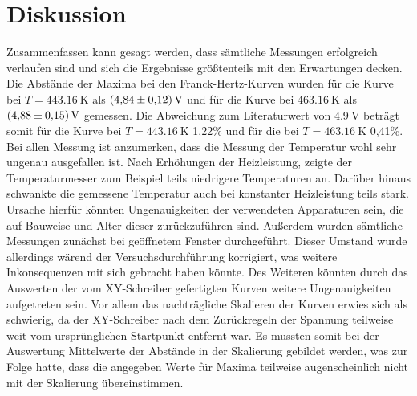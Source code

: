 \section{Diskussion}
\label{sec:Diskussion}

Zusammenfassen kann gesagt werden, dass sämtliche Messungen erfolgreich verlaufen sind und sich die Ergebnisse größtenteils mit den Erwartungen decken.
\newline
Die Abstände der Maxima bei den Franck-Hertz-Kurven wurden für die Kurve bei $T = \SI{443,16}{\kelvin}$ als $\SI{4,84 \pm 0,12}{\volt}$
und für die Kurve bei $\SI{463,16}{\kelvin}$ als $\SI{4,88 \pm 0,15}{\volt}$ gemessen. Die Abweichung zum Literaturwert von $\SI{4,9}{\volt}$
beträgt somit für die Kurve bei $T = \SI{443,16}{\kelvin}$ 1,22\% und für die bei $T = \SI{463,16}{\kelvin}$ 0,41\%.
\newline \newline
Bei allen Messung ist anzumerken, dass die Messung der Temperatur wohl sehr ungenau ausgefallen ist. Nach Erhöhungen der Heizleistung,
zeigte der Temperaturmesser zum Beispiel teils niedrigere Temperaturen an. Darüber hinaus schwankte die gemessene Temperatur auch bei konstanter Heizleistung teils stark.
Ursache hierfür könnten Ungenauigkeiten der verwendeten Apparaturen sein, die auf Bauweise und Alter dieser zurückzuführen sind. Außerdem wurden sämtliche Messungen
zunächst bei geöffnetem Fenster durchgeführt. Dieser Umstand wurde allerdings wärend der Versuchsdurchführung korrigiert, was weitere Inkonsequenzen mit sich gebracht
haben könnte.
\newline
Des Weiteren könnten durch das Auswerten der vom XY-Schreiber gefertigten Kurven weitere Ungenauigkeiten aufgetreten sein. Vor allem das nachträgliche Skalieren der
Kurven erwies sich als schwierig, da der XY-Schreiber nach dem Zurückregeln der Spannung teilweise weit vom ursprünglichen Startpunkt entfernt war. Es mussten somit
bei der Auswertung Mittelwerte der Abstände in der Skalierung gebildet werden, was zur Folge hatte, dass die angegeben Werte für Maxima teilweise augenscheinlich
nicht mit der Skalierung übereinstimmen.